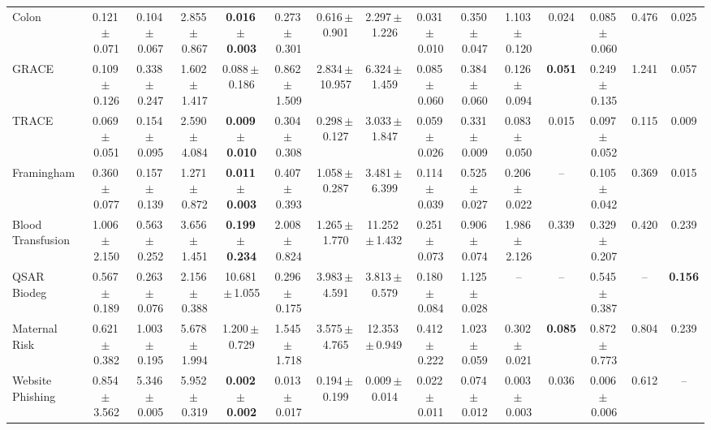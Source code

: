 \documentclass[8pt]{extarticle}
\begin{document}
\begin{longtable}{l*{14}{c}}
Colon & 0.121\,$\pm$\,0.071 & 0.104\,$\pm$\,0.067 & 2.855\,$\pm$\,0.867 & \textbf{0.016\,$\pm$\,0.003} & 0.273\,$\pm$\,0.301 & 0.616\,$\pm$\,0.901 & 2.297\,$\pm$\,1.226 & 0.031\,$\pm$\,0.010 & 0.350\,$\pm$\,0.047 & 1.103\,$\pm$\,0.120 & 0.024 & 0.085\,$\pm$\,0.060 & 0.476 & 0.025 \\
GRACE & 0.109\,$\pm$\,0.126 & 0.338\,$\pm$\,0.247 & 1.602\,$\pm$\,1.417 & 0.088\,$\pm$\,0.186 & 0.862\,$\pm$\,1.509 & 2.834\,$\pm$\,10.957 & 6.324\,$\pm$\,1.459 & 0.085\,$\pm$\,0.060 & 0.384\,$\pm$\,0.060 & 0.126\,$\pm$\,0.094 & \textbf{0.051} & 0.249\,$\pm$\,0.135 & 1.241 & 0.057 \\
TRACE & 0.069\,$\pm$\,0.051 & 0.154\,$\pm$\,0.095 & 2.590\,$\pm$\,4.084 & \textbf{0.009\,$\pm$\,0.010} & 0.304\,$\pm$\,0.308 & 0.298\,$\pm$\,0.127 & 3.033\,$\pm$\,1.847 & 0.059\,$\pm$\,0.026 & 0.331\,$\pm$\,0.009 & 0.083\,$\pm$\,0.050 & 0.015 & 0.097\,$\pm$\,0.052 & 0.115 & 0.009 \\
Framingham & 0.360\,$\pm$\,0.077 & 0.157\,$\pm$\,0.139 & 1.271\,$\pm$\,0.872 & \textbf{0.011\,$\pm$\,0.003} & 0.407\,$\pm$\,0.393 & 1.058\,$\pm$\,0.287 & 3.481\,$\pm$\,6.399 & 0.114\,$\pm$\,0.039 & 0.525\,$\pm$\,0.027 & 0.206\,$\pm$\,0.022 & -- & 0.105\,$\pm$\,0.042 & 0.369 & 0.015 \\
Blood Transfusion & 1.006\,$\pm$\,2.150 & 0.563\,$\pm$\,0.252 & 3.656\,$\pm$\,1.451 & \textbf{0.199\,$\pm$\,0.234} & 2.008\,$\pm$\,0.824 & 1.265\,$\pm$\,1.770 & 11.252\,$\pm$\,1.432 & 0.251\,$\pm$\,0.073 & 0.906\,$\pm$\,0.074 & 1.986\,$\pm$\,2.126 & 0.339 & 0.329\,$\pm$\,0.207 & 0.420 & 0.239 \\
QSAR Biodeg & 0.567\,$\pm$\,0.189 & 0.263\,$\pm$\,0.076 & 2.156\,$\pm$\,0.388 & 10.681\,$\pm$\,1.055 & 0.296\,$\pm$\,0.175 & 3.983\,$\pm$\,4.591 & 3.813\,$\pm$\,0.579 & 0.180\,$\pm$\,0.084 & 1.125\,$\pm$\,0.028 & -- & -- & 0.545\,$\pm$\,0.387 & -- & \textbf{0.156} \\
Maternal Risk & 0.621\,$\pm$\,0.382 & 1.003\,$\pm$\,0.195 & 5.678\,$\pm$\,1.994 & 1.200\,$\pm$\,0.729 & 1.545\,$\pm$\,1.718 & 3.575\,$\pm$\,4.765 & 12.353\,$\pm$\,0.949 & 0.412\,$\pm$\,0.222 & 1.023\,$\pm$\,0.059 & 0.302\,$\pm$\,0.021 & \textbf{0.085} & 0.872\,$\pm$\,0.773 & 0.804 & 0.239 \\
Website Phishing & 0.854\,$\pm$\,3.562 & 5.346\,$\pm$\,0.005 & 5.952\,$\pm$\,0.319 & \textbf{0.002\,$\pm$\,0.002} & 0.013\,$\pm$\,0.017 & 0.194\,$\pm$\,0.199 & 0.009\,$\pm$\,0.014 & 0.022\,$\pm$\,0.011 & 0.074\,$\pm$\,0.012 & 0.003\,$\pm$\,0.003 & 0.036 & 0.006\,$\pm$\,0.006 & 0.612 & -- \\
\end{longtable}
\end{document}
